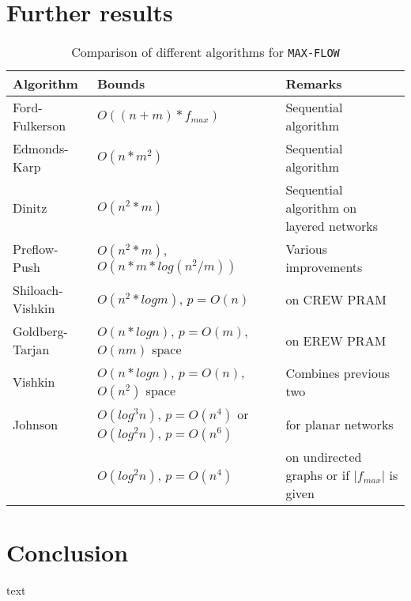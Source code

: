 \documentclass[a4paper,10pt, twocolumn]{article}
\begin{document}
\section{Further results}
\label{sec:further}

\begin{table*}
\begin{tabular}{|l|l|l|}
\hline
Algorithm & Bounds & Remarks \\
\hline
Ford-Fulkerson\cite{ahuja93} & $O((n+m) * f_{max})$ & Sequential algorithm \\
Edmonds-Karp\cite{ahuja93} & $O(n*m^2)$ & Sequential algorithm  \\
Dinitz\cite{dinitz70}& $O(n^2*m)$ & Sequential algorithm on layered networks\\
Preflow-Push\cite{ahuja93} & $O(n^2*m)$, $O(n*m*log(n^2/m))$ & Various improvements\\
Shiloach-Vishkin\cite{yossi81} & $O(n^2*log m)$, $p=O(n)$ & on CREW PRAM\\
Goldberg-Tarjan\cite{goldberg89} & $O(n*log n)$, $p=O(m)$, $O(nm)$ space & on EREW PRAM \\
Vishkin\cite{vishkin92} & $O(n*log n)$, $p=O(n)$, $O(n^2)$ space & Combines previous two\\
Johnson\cite{johnson87} & $O(log^{3} n)$, $p=O(n^{4})$ or $O(log^{2} n)$, $p=O(n^{6})$ &
for planar networks\\
 & $	O(log^{2} n)$, $p=O(n^{4})$ & on undirected graphs or if  $\lvert f_{max} \rvert$ is given\\
\hline
\end{tabular}
\caption{Comparison of different algorithms for \lstinline|MAX-FLOW|}
\label{tbl:results}
\end{table*}


\section{Conclusion}
text \cite{ahuja93} \cite{papa95} \cite{yossi81} \cite{vishkin92} \cite{goldberg89} \cite{goldberg91} \cite{goldberg98} \cite{johnson87} \cite{schieber89} \cite{cherivan89} 

\printbibliography
\end{document}
